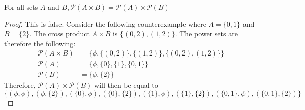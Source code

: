 \documentclass[12pt,letterpaper, onecolumn]{exam}
\begin{document}
\begin{questions}
	\setcounter{question}{20}\question For all sets $A$ and $B, \mathscr{P}(A \times B)=\mathscr{P}(A)\times \mathscr{P}(B)$
	\begin{solution}
		\begin{proof}
			This is false. Consider the following counterexample where $A=\{0,1\}$ and $B=\{2\}$. The cross product $A\times B$ is $\{(0,2),(1,2)\}$. The power sets are therefore the following:
			\begin{align*}
				\mathscr{P}(A\times B)&=\{\phi, \{(0,2)\},\{(1,2)\},\{(0,2),(1,2)\}\}\\
				\mathscr{P}(A)&=\{\phi,\{0\},\{1\},\{0,1\}\}\\
				\mathscr{P}(B)&=\{\phi,\{2\}\}
			\end{align*}
			Therefore, $\mathscr{P}(A)\times\mathscr{P}(B)$ will then be equal to         $$\{(\phi,\phi),(\phi,\{2\}),(\{0\},\phi),(\{0\},\{2\}),(\{1\},\phi),(\{1\},\{2\}),(\{0,1\},\phi),(\{0,1\},\{2\})\}$$
			

\end{proof}
\end{solution}
\end{questions}
\end{document}
